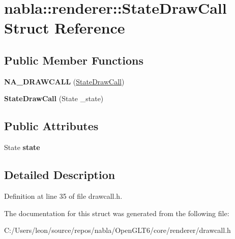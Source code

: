 \hypertarget{structnabla_1_1renderer_1_1_state_draw_call}{}\section{nabla\+::renderer\+::State\+Draw\+Call Struct Reference}
\label{structnabla_1_1renderer_1_1_state_draw_call}
\subsection*{Public Member Functions}
\begin{DoxyCompactItemize}
\item 
\mbox{\label{structnabla_1_1renderer_1_1_state_draw_call_a5d1a141067096a9608300ec16ec62026}} 
{\bfseries N\+A\+\_\+\+D\+R\+A\+W\+C\+A\+LL} (\mbox{\hyperlink{structnabla_1_1renderer_1_1_state_draw_call}{State\+Draw\+Call}})
\item 
\mbox{\label{structnabla_1_1renderer_1_1_state_draw_call_aa0c018b493c6b4f6cd688eaf95e689c9}} 
{\bfseries State\+Draw\+Call} (State \+\_\+state)
\end{DoxyCompactItemize}
\subsection*{Public Attributes}
\begin{DoxyCompactItemize}
\item 
\mbox{\label{structnabla_1_1renderer_1_1_state_draw_call_ade4ac929f0b3455cf4bf31236275f4a0}} 
State {\bfseries state}
\end{DoxyCompactItemize}


\subsection{Detailed Description}


Definition at line 35 of file drawcall.\+h.



The documentation for this struct was generated from the following file\+:\begin{DoxyCompactItemize}
\item 
C\+:/\+Users/leon/source/repos/nabla/\+Open\+G\+L\+T6/core/renderer/drawcall.\+h\end{DoxyCompactItemize}
